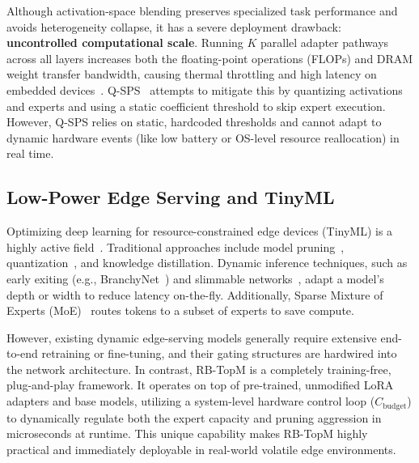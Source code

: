 Although activation-space blending preserves specialized task performance and avoids heterogeneity collapse, it has a severe deployment drawback: \textbf{uncontrolled computational scale}. Running $K$ parallel adapter pathways across all layers increases both the floating-point operations (FLOPs) and DRAM weight transfer bandwidth, causing thermal throttling and high latency on embedded devices~\citep{shen2024collaborative}. Q-SPS~\citep{qsps2026} attempts to mitigate this by quantizing activations and experts and using a static coefficient threshold to skip expert execution. However, Q-SPS relies on static, hardcoded thresholds and cannot adapt to dynamic hardware events (like low battery or OS-level resource reallocation) in real time.

\subsection{Low-Power Edge Serving and TinyML}
Optimizing deep learning for resource-constrained edge devices (TinyML) is a highly active field~\citep{warden2020tinyml}. Traditional approaches include model pruning~\citep{han2015deep}, quantization~\citep{gholami2021survey}, and knowledge distillation. Dynamic inference techniques, such as early exiting (e.g., BranchyNet~\citep{teerapittayanon2016branchynet}) and slimmable networks~\citep{tang2020slimmable}, adapt a model's depth or width to reduce latency on-the-fly. Additionally, Sparse Mixture of Experts (MoE)~\citep{shazeer2017outrageously,fedus2022switch} routes tokens to a subset of experts to save compute. 

However, existing dynamic edge-serving models generally require extensive end-to-end retraining or fine-tuning, and their gating structures are hardwired into the network architecture. In contrast, RB-TopM is a completely training-free, plug-and-play framework. It operates on top of pre-trained, unmodified LoRA adapters and base models, utilizing a system-level hardware control loop ($C_{\text{budget}}$) to dynamically regulate both the expert capacity and pruning aggression in microseconds at runtime. This unique capability makes RB-TopM highly practical and immediately deployable in real-world volatile edge environments.
